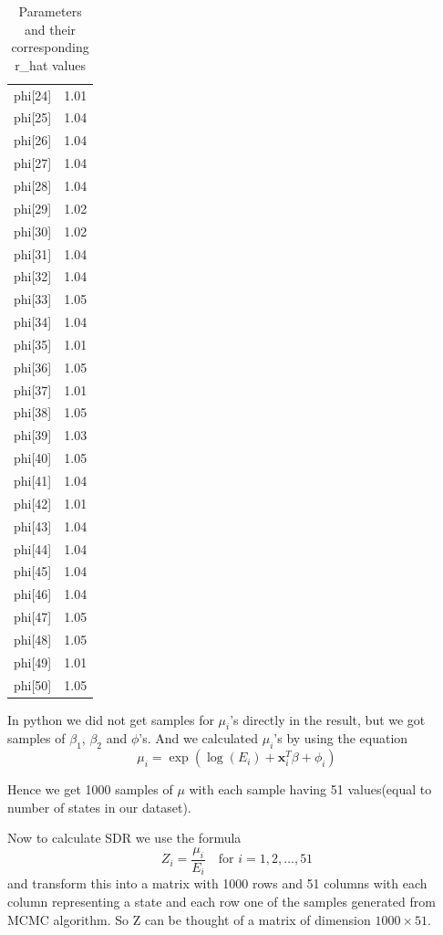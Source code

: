 \documentclass[enabledeprecatedfontcommands,parskip=half,twoside=semi,BCOR=0mm]{scrreprt}
\numberwithin{equation}{chapter}
\theoremstyle{definition}
\theoremstyle{remark}
\begin{document}
\begin{table}[h!]
\begin{adjustbox}{max width=\textwidth}
\begin{minipage}{0.48\textwidth}
\begin{tabular}{l r}
    phi[24] & 1.01 \\
    phi[25] & 1.04 \\
    phi[26] & 1.04 \\
    phi[27] & 1.04 \\
    phi[28] & 1.04 \\
    phi[29] & 1.02 \\
    phi[30] & 1.02 \\
    phi[31] & 1.04 \\
    phi[32] & 1.04 \\
    phi[33] & 1.05 \\
    phi[34] & 1.04 \\
    phi[35] & 1.01 \\
    phi[36] & 1.05 \\
    phi[37] & 1.01 \\
    phi[38] & 1.05 \\
    phi[39] & 1.03 \\
    phi[40] & 1.05 \\
    phi[41] & 1.04 \\
    phi[42] & 1.01 \\
    phi[43] & 1.04 \\
    phi[44] & 1.04 \\
    phi[45] & 1.04 \\
    phi[46] & 1.04 \\
    phi[47] & 1.05 \\
    phi[48] & 1.05 \\
    phi[49] & 1.01 \\
    phi[50] & 1.05 \\
    \end{tabular}
    \end{minipage}
    \end{adjustbox}
    \caption{Parameters and their corresponding r\_hat values}
    \label{tab:Table 1}
    \end{table}

    
    
    In python we did not get samples for \(\mu_i\)'s directly in the result, but we got samples of \(\beta_1\), \(\beta_2\) and \(\phi\)'s. And we calculated \(\mu_i\)'s by using the equation 
    \[
    \mu_i = \exp(\log(E_i) + \mathbf{x}_i^T \beta + \phi_i)
    \] 
    
    Hence we get 1000 samples of \(\mu\) with each sample having 51 values(equal to number of states in our dataset). 
    
    Now to calculate SDR we use the formula 
    \[
    Z_i = \frac{\mu_i}{E_i} \quad \text{for } i = 1, 2, \ldots, 51
    \]
    and transform this into a matrix with 1000 rows and 51 columns with each column representing a state and each row one of the samples generated from MCMC algorithm. So Z can be thought of a matrix of dimension \(1000\times51\). 
    
\end{document}
